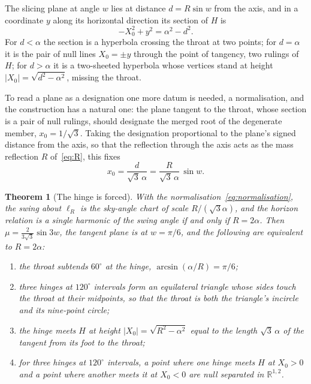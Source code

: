 \documentclass[11pt]{article}
\theoremstyle{plain}
\newtheorem{theorem}{Theorem}
\theoremstyle{definition}
\theoremstyle{remark}
\begin{document}
The slicing plane at angle $w$ lies at distance $d=R\sin w$ from the axis, and in a coordinate $y$ along its
horizontal direction its section of $H$ is
\begin{equation}\label{eq:section}
-X_{0}^{2}+y^{2}=\alpha^{2}-d^{2}.
\end{equation}
For $d<\alpha$ the section is a hyperbola crossing the throat at two points; for $d=\alpha$ it is the pair of null
lines $X_{0}=\pm y$ through the point of tangency, two rulings of $H$; for $d>\alpha$ it is a two-sheeted hyperbola
whose vertices stand at height $|X_{0}|=\sqrt{d^{2}-\alpha^{2}}$, missing the throat.

To read a plane as a designation one more datum is needed, a normalisation, and the construction has a natural
one: the plane tangent to the throat, whose section is a pair of null rulings, should designate the merged root
of the degenerate member, $x_{0}=1/\sqrt3$. Taking the designation proportional to the plane's signed distance
from the axis, so that the reflection through the axis acts as the mass reflection $R$ of~\eqref{eq:R}, this
fixes
\begin{equation}\label{eq:normalisation}
x_{0}=\frac{d}{\sqrt3\,\alpha}=\frac{R}{\sqrt3\,\alpha}\,\sin w .
\end{equation}

\begin{theorem}[The hinge is forced]\label{thm:hinge}
With the normalisation~\eqref{eq:normalisation}, the swing about $\ell_{R}$ is the sky-angle chart of scale
$R/(\sqrt3\alpha)$, and the horizon relation is a single harmonic of the swing angle if and only if $R=2\alpha$.
Then $\mu=\tfrac{2}{3\sqrt3}\sin3w$, the tangent plane is at $w=\pi/6$, and the following are equivalent to
$R=2\alpha$:
\renewcommand{\labelenumi}{(\roman{enumi})}
\begin{enumerate}\itemsep0pt
\item the throat subtends $60^{\circ}$ at the hinge, $\arcsin(\alpha/R)=\pi/6$;
\item three hinges at $120^{\circ}$ intervals form an equilateral triangle whose sides touch the throat at their
midpoints, so that the throat is both the triangle's incircle and its nine-point circle;
\item the hinge meets $H$ at height $|X_{0}|=\sqrt{R^{2}-\alpha^{2}}$ equal to the length $\sqrt3\,\alpha$ of the
tangent from its foot to the throat;
\item for three hinges at $120^{\circ}$ intervals, a point where one hinge meets $H$ at $X_{0}>0$ and a point where
another meets it at $X_{0}<0$ are null separated in $\mathbb{R}^{1,2}$.
\end{enumerate}
\end{theorem}
\end{document}
